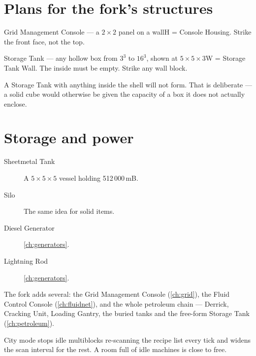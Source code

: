 \section{Plans for the fork's structures}

\begin{mbplan}{Grid Management Console --- a $2\times2$ panel on a wall}{H = Console Housing.
Strike the front face, not the top.}
\hspace{8mm}
\end{mbplan}

\begin{mbplan}{Storage Tank --- any hollow box from $3^3$ to $16^3$, shown at $5\times5\times3$}{W
= Storage Tank Wall. The inside must be empty. Strike any wall block.}
\hspace{5mm}
\hspace{5mm}
\end{mbplan}

\begin{iewarning}
A Storage Tank with anything inside the shell will not form. That is deliberate --- a solid cube
would otherwise be given the capacity of a box it does not actually enclose.
\end{iewarning}

\section{Storage and power}

\begin{description}
\item[Sheetmetal Tank] A $5\times5\times5$ vessel holding 512\,000\,mB.
\item[Silo] The same idea for solid items.
\item[Diesel Generator] \autoref{ch:generators}.
\item[Lightning Rod] \autoref{ch:generators}.
\end{description}

\begin{iefork}
The fork adds several: the Grid Management Console (\autoref{ch:grid}), the Fluid
Control Console (\autoref{ch:fluidnet}), and the whole petroleum chain --- Derrick, Cracking Unit,
Loading Gantry, the buried tanks and the free-form Storage Tank (\autoref{ch:petroleum}).
\end{iefork}

\begin{iefork}
City mode stops idle multiblocks re-scanning the recipe list every tick and widens the scan interval
for the rest. A room full of idle machines is close to free.
\end{iefork}
